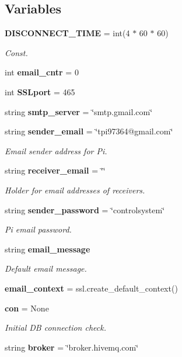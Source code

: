 \subsection*{Variables}
\begin{DoxyCompactItemize}
\item 
\textbf{ D\+I\+S\+C\+O\+N\+N\+E\+C\+T\+\_\+\+T\+I\+ME} = int(4 $\ast$ 60 $\ast$ 60)
\begin{DoxyCompactList}\small\item\em Const. \end{DoxyCompactList}\item 
int \textbf{ email\+\_\+cntr} = 0
\item 
int \textbf{ S\+S\+Lport} = 465
\item 
string \textbf{ smtp\+\_\+server} = \char`\"{}smtp.\+gmail.\+com\char`\"{}
\item 
string \textbf{ sender\+\_\+email} = \char`\"{}tpi97364@gmail.\+com\char`\"{}
\begin{DoxyCompactList}\small\item\em Email sender address for Pi. \end{DoxyCompactList}\item 
string \textbf{ receiver\+\_\+email} = \char`\"{}\char`\"{}
\begin{DoxyCompactList}\small\item\em Holder for email addresses of receivers. \end{DoxyCompactList}\item 
string \textbf{ sender\+\_\+password} = \char`\"{}controlsystem\char`\"{}
\begin{DoxyCompactList}\small\item\em Pi email password. \end{DoxyCompactList}\item 
string \textbf{ email\+\_\+message}
\begin{DoxyCompactList}\small\item\em Default email message. \end{DoxyCompactList}\item 
\textbf{ email\+\_\+context} = ssl.\+create\+\_\+default\+\_\+context()
\item 
\textbf{ con} = None
\begin{DoxyCompactList}\small\item\em Initial DB connection check. \end{DoxyCompactList}\item 
string \textbf{ broker} = \char`\"{}broker.\+hivemq.\+com\char`\"{}

\end{DoxyCompactItemize}
